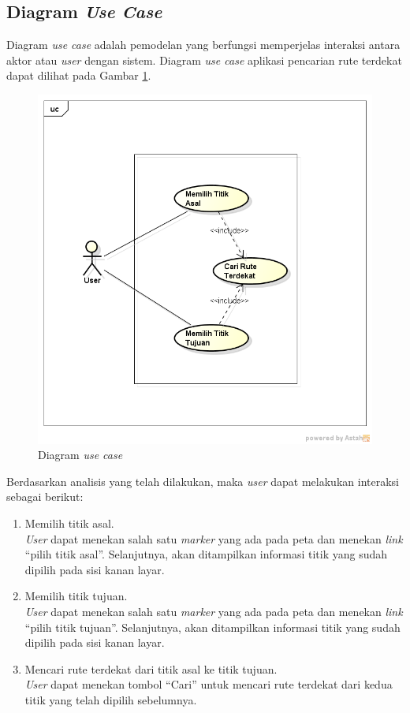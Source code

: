 \subsection{Diagram \textit{Use Case}}
Diagram \textit{use case} adalah pemodelan yang berfungsi memperjelas interaksi
antara aktor atau \textit{user} dengan sistem. 
Diagram \textit{use case} aplikasi pencarian rute terdekat dapat dilihat pada
Gambar \ref{fig:usecase}.
\begin{figure}[h]
\centering
\includegraphics[scale=0.6]{Gambar/usecase}
\caption[Diagram \textit{use case}]{Diagram \textit{use case}}
\label{fig:usecase}
\end{figure}

Berdasarkan analisis yang telah dilakukan, maka \textit{user} dapat melakukan
interaksi sebagai berikut:
\begin{enumerate}
  \item Memilih titik asal.\\
  \textit{User} dapat menekan salah satu \textit{marker} yang ada pada peta dan
  menekan \textit{link} ``pilih titik asal''. Selanjutnya, akan ditampilkan
  informasi titik yang sudah dipilih pada sisi kanan layar.
  
  \item Memilih titik tujuan.\\
  \textit{User} dapat menekan salah satu \textit{marker} yang ada pada peta dan
  menekan \textit{link} ``pilih titik tujuan''. Selanjutnya, akan ditampilkan
  informasi titik yang sudah dipilih pada sisi kanan layar.
  
  \item Mencari rute terdekat dari titik asal ke titik tujuan.\\
  \textit{User} dapat menekan tombol ``Cari'' untuk mencari rute terdekat dari
  kedua titik yang telah dipilih sebelumnya.
\end{enumerate}

